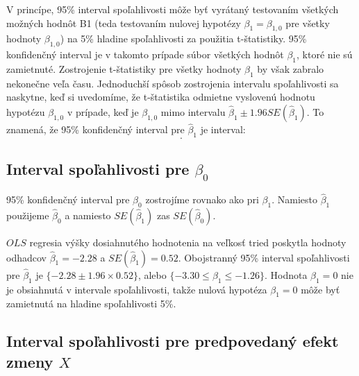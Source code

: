 \documentclass[]{tukediphc}
\begin{document}
V princípe, 95\% interval spoľahlivosti môže byť vyrátaný testovaním všetkých možných hodnôt B1 (teda testovaním nulovej hypotézy $\beta_{1} = \beta_{1, 0}$ pre všetky hodnoty $\beta_{1, 0}$) na 5\% hladine spoľahlivosti za použitia t-štatistiky. 95\% konfidenčný interval je v takomto prípade súbor všetkých hodnôt $\beta_{1}$, ktoré nie sú zamietnuté. Zostrojenie t-štatistiky pre všetky hodnoty $\beta_{1}$ by však zabralo nekonečne veľa času. 
Jednoduchší spôsob zostrojenia intervalu spoľahlivosti sa naskytne, keď si uvedomíme, že t-štatistika odmietne vyslovenú hodnotu hypotézu $\beta_{1, 0}$ v prípade, keď je $\beta_{1, 0}$ mimo intervalu $\hat\beta_{1} \pm 1.96SE(\hat\beta_{1})$. To znamená, že 95\% konfidenčný interval pre $\hat\beta_{1}$ je interval: 
\begin{equation}
    [\hat\beta_{1} - 1.96SE(\hat\beta_{1}) \ , \ \hat\beta_{1} + 1.96SE(\hat\beta_{1})].
\end{equation}

\subsection{Interval spoľahlivosti pre $\beta_0$}

95\% konfidenčný interval pre $\beta_0$ zostrojíme rovnako ako pri $\beta_1$. Namiesto $\hat\beta_1$  použijeme $\hat\beta_0$  a namiesto $SE(\hat\beta_{1})$ zas $SE(\hat\beta_{0})$.

$OLS$ regresia výšky dosiahnutého hodnotenia na veľkosť tried poskytla hodnoty odhadcov $\hat\beta_{1} = -2.28$ a $SE(\hat\beta_{1}) = 0.52$. Obojstranný 95\% interval spoľahlivosti pre $\hat\beta_{1}$ je $\{-2.28 \pm 1.96 \times 0.52\}$, alebo $\{-3.30 \leq \beta_{1} \leq -1.26\}$. Hodnota $\beta_{1} = 0$ nie je obsiahnutá v intervale spoľahlivosti, takže nulová hypotéza $\beta_{1} = 0$ môže byť zamietnutá na hladine spoľahlivosti 5\%. 

\subsection{Interval spoľahlivosti pre predpovedaný efekt zmeny $X$}
\end{document}
